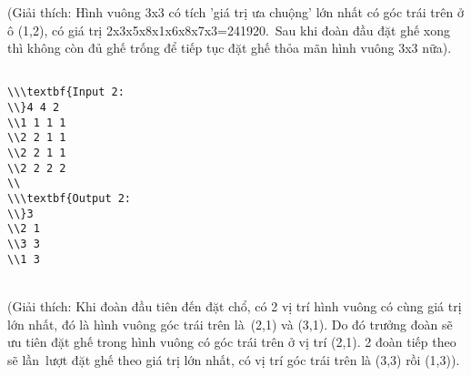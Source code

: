    (Giải thích: Hình vuông 3x3 có tích 'giá trị ưa chuộng' lớn nhất có góc trái trên ở ô (1,2), có giá trị 2x3x5x8x1x6x8x7x3=241920. Sau khi đoàn đầu đặt ghế xong thì không còn đủ ghế trống để tiếp tục đặt ghế thỏa mãn hình vuông 3x3 nữa).  
\begin{verbatim}

\\\textbf{Input 2:
\\}4 4 2
\\1 1 1 1
\\2 2 1 1
\\2 2 1 1
\\2 2 2 2
\\
\\\textbf{Output 2:
\\}3
\\2 1
\\3 3
\\1 3\end{verbatim}


\\   (Giải thích: Khi đoàn đầu tiên đến đặt chổ, có 2 vị trí hình vuông có cùng giá trị lớn nhất, đó là hình vuông góc trái trên là (2,1) và (3,1). Do đó trưởng đoàn sẽ ưu tiên đặt ghế trong hình vuông có góc trái trên ở vị trí (2,1). 2 đoàn tiếp theo sẽ lần lượt đặt ghế theo giá trị lớn nhất, có vị trí góc trái trên là (3,3) rồi (1,3)).  